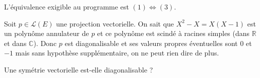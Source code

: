 \documentclass[a4paper,10pt]{report}
\begin{document}
 \begin{preuve} L'équivalence exigible au programme est $(1) \Longleftrightarrow (3)$.
 
 \medskip
% 
% 
% 
% 

\vspace{15cm}
 \end{preuve}
 
 \phantom{test}
 
 \vspace{6cm}
 \medskip
 
 \begin{ex} Soit $p \in \mathcal{L}(E)$ une projection vectorielle. On sait que $X^2-X=X(X-1)$ est un polynôme annulateur de $p$ et ce polynôme est scindé à racines simples (dans $\mathbb{R}$ et dans $\mathbb{C}$). Donc $p$ est diagonalisable et ses valeurs propres éventuelles sont $0$ et $-1$ mais sans hypothèse supplémentaire, on ne peut rien dire de plus.
 \end{ex}
 
 \begin{exa} Une symétrie vectorielle est-elle diagonalisable ?
 \end{exa}
 
\end{document}
